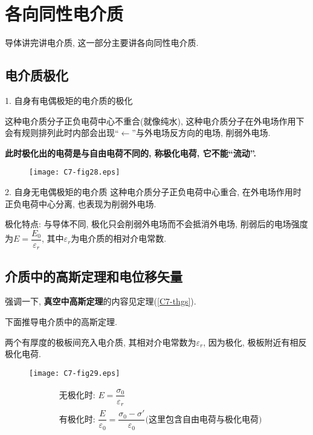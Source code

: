 \section{各向同性电介质} \label{7.4}

导体讲完讲电介质, 这一部分主要讲各向同性电介质. 

\subsection{电介质极化}

1. 自身有电偶极矩的电介质的极化

这种电介质分子正负电荷中心不重合(就像纯水), 这种电介质分子在外电场作用下会有规则排列此时内部会出现“$\leftarrow$”与外电场反方向的电场, 削弱外电场.

\textbf{此时极化出的电荷是与自由电荷不同的, 称极化电荷, 它不能“流动”.} 

\begin{figure}[H]
	\centering
	\texttt{[image: C7-fig28.eps]}
\end{figure}

2. 自身无电偶极矩的电介质
这种电介质分子正负电荷中心重合, 在外电场作用时正负电荷中心分离, 也表现为削弱外电场. 

极化特点: 与导体不同, 极化只会削弱外电场而不会抵消外电场, 削弱后的电场强度为$E = \dfrac{E_0}{\varepsilon_r}$, 其中$\varepsilon_r$为电介质的相对介电常数.

\subsection{介质中的高斯定理和电位移矢量}

强调一下, \textbf{真空中高斯定理}的内容见定理(\ref{C7-thgs}). 

下面推导电介质中的高斯定理. 

两个有厚度的极板间充入电介质, 其相对介电常数为$\varepsilon_r$, 因为极化, 极板附近有相反极化电荷. 

\begin{figure}[H]
	\centering
	\texttt{[image: C7-fig29.eps]}
\end{figure}

\begin{align*}
	&\text{无极化时:~}E = \dfrac{\sigma_0}{\varepsilon_r} \\
	&\text{有极化时:~}\dfrac{E}{\varepsilon_0} = \dfrac{\sigma_0 - \sigma'}{\varepsilon_0}\text{(这里包含自由电荷与极化电荷)}
\end{align*}

